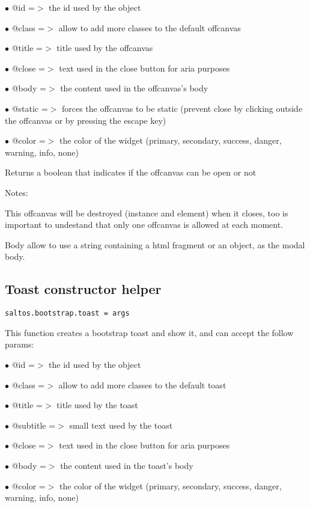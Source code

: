 \documentclass[a4paper]{book}
\begin{document}
\begin{compactitem}
\item[\color{myblue}$\bullet$] @id     =$>$ the id used by the object
\item[\color{myblue}$\bullet$] @class  =$>$ allow to add more classes to the default offcanvas
\item[\color{myblue}$\bullet$] @title  =$>$ title used by the offcanvas
\item[\color{myblue}$\bullet$] @close  =$>$ text used in the close button for aria purposes
\item[\color{myblue}$\bullet$] @body   =$>$ the content used in the offcanvas's body
\item[\color{myblue}$\bullet$] @static =$>$ forces the offcanvas to be static (prevent close by clicking outside the
           offcanvas or by pressing the escape key)
\item[\color{myblue}$\bullet$] @color  =$>$ the color of the widget (primary, secondary, success, danger, warning, info, none)
\end{compactitem}

Returns a boolean that indicates if the offcanvas can be open or not

Notes:

This offcanvas will be destroyed (instance and element) when it closes, too is important
to undestand that only one offcanvas is allowed at each moment.

Body allow to use a string containing a html fragment or an object, as the modal body.

\hypertarget{toc504}{}
\subsection{Toast constructor helper}

\begin{lstlisting}
saltos.bootstrap.toast = args
\end{lstlisting}

This function creates a bootstrap toast and show it, and can accept the follow params:

\begin{compactitem}
\item[\color{myblue}$\bullet$] @id       =$>$ the id used by the object
\item[\color{myblue}$\bullet$] @class    =$>$ allow to add more classes to the default toast
\item[\color{myblue}$\bullet$] @title    =$>$ title used by the toast
\item[\color{myblue}$\bullet$] @subtitle =$>$ small text used by the toast
\item[\color{myblue}$\bullet$] @close    =$>$ text used in the close button for aria purposes
\item[\color{myblue}$\bullet$] @body     =$>$ the content used in the toast's body
\item[\color{myblue}$\bullet$] @color    =$>$ the color of the widget (primary, secondary, success, danger, warning, info, none)
\end{compactitem}
\end{document}
